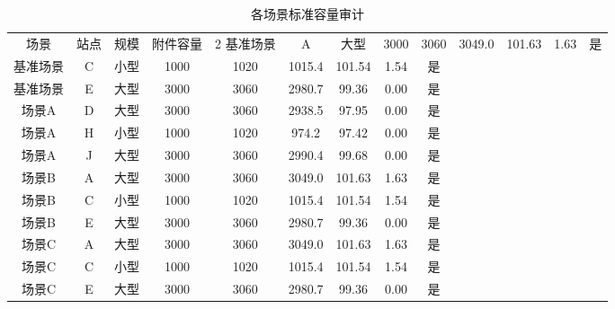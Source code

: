 \begin{table}[htbp]
\centering
\caption{各场景标准容量审计}
\begin{tabular}{|c|c|c|c|c|c|c|c|c|}
\hline
场景 & 站点 & 规模 & 附件容量 & 2%
\hline
基准场景 & A & 大型 & 3000 & 3060 & 3049.0 & 101.63 & 1.63 & 是 \\
基准场景 & C & 小型 & 1000 & 1020 & 1015.4 & 101.54 & 1.54 & 是 \\
基准场景 & E & 大型 & 3000 & 3060 & 2980.7 & 99.36 & 0.00 & 是 \\
场景A & D & 大型 & 3000 & 3060 & 2938.5 & 97.95 & 0.00 & 是 \\
场景A & H & 小型 & 1000 & 1020 & 974.2 & 97.42 & 0.00 & 是 \\
场景A & J & 大型 & 3000 & 3060 & 2990.4 & 99.68 & 0.00 & 是 \\
场景B & A & 大型 & 3000 & 3060 & 3049.0 & 101.63 & 1.63 & 是 \\
场景B & C & 小型 & 1000 & 1020 & 1015.4 & 101.54 & 1.54 & 是 \\
场景B & E & 大型 & 3000 & 3060 & 2980.7 & 99.36 & 0.00 & 是 \\
场景C & A & 大型 & 3000 & 3060 & 3049.0 & 101.63 & 1.63 & 是 \\
场景C & C & 小型 & 1000 & 1020 & 1015.4 & 101.54 & 1.54 & 是 \\
场景C & E & 大型 & 3000 & 3060 & 2980.7 & 99.36 & 0.00 & 是 \\
\hline
\end{tabular}
\end{table}
